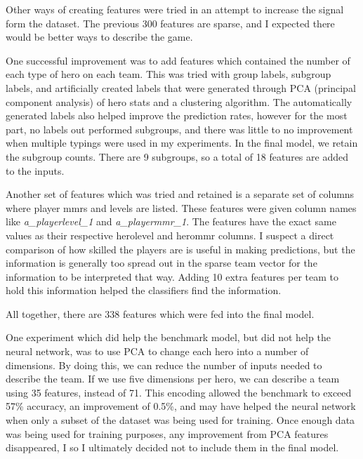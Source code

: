 \documentclass[twoside,twocolumn]{article}
\begin{document}
Other ways of creating features were tried in an attempt to increase the signal form the dataset.  The previous 300 features are sparse, and I expected there would be better ways to describe the game.

One successful improvement was to add features which contained the number of each type of hero on each team.  This was tried with group labels, subgroup labels, and artificially created labels that were generated through PCA (principal component analysis) of hero stats and a clustering algorithm.  The automatically generated labels also helped improve the prediction rates, however for the most part, no labels out performed subgroups, and there was little to no improvement when multiple typings were used in my experiments.  In the final model, we retain the subgroup counts.  There are 9 subgroups, so a total of 18 features are added to the inputs.

Another set of features which was tried and retained is a separate set of columns where player mmrs and levels are listed.  These features were given column names like \textit{a\_playerlevel\_1} and \textit{a\_playermmr\_1}.  The features have the exact same values as their respective herolevel and herommr columns. I suspect a direct comparison of how skilled the players are is useful in making predictions, but the information is generally too spread out in the sparse team vector for the information to be interpreted that way.  Adding 10 extra features per team to hold this information helped the classifiers find the information.

All together, there are 338 features which were fed into the final model.

One experiment which did help the benchmark model, but did not help the neural network, was to use PCA to change each hero into a number of dimensions.  By doing this, we can reduce the number of inputs needed to describe the team.  If we use five dimensions per hero, we can describe a team using 35 features, instead of 71.  This encoding allowed the benchmark to exceed 57\% accuracy, an improvement of 0.5\%, and may have helped the neural network when only a subset of the dataset was being used for training.  Once enough data was being used for training purposes, any improvement from PCA features disappeared, I so I ultimately decided not to include them in the final model.
\end{document}
